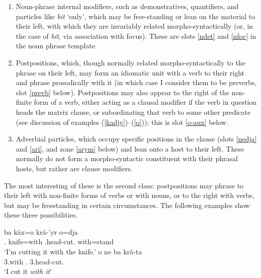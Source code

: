 \documentclass[output=paper]{langscibook}
\begin{document}
\begin{enumerate}
  \item Noun-phrase internal modifiers, such as demonstratives, quantifiers, and particles like {\em bit} ‘only’, which may be free-standing or lean on the material to their left, with which they are invariably related morpho-syntactically (or, in the case of {\em bit}, via association with focus). These are slots \ref{ndet} and \ref{nfoc} in the noun phrase template.
  \item\label{postpo} Postpositions, which, though normally related morpho-syntactically to the phrase on their left, may form an idiomatic unit with a verb to their right and phrase prosodically with it (in which case I consider them to be preverbs, slot \ref{prevb} below). Postpositions may also appear to the right of the non-finite form of a verb, either acting as a clausal modifier if the verb in question heads the matrix clause, or subordinating that verb to some other predicate (see discussion of examples (\ref{kadjy})--(\ref{o})); this is slot \ref{o-aux} below.
  \item Adverbial particles, which occupy specific positions in the clause (slots \ref{nedja} and \ref{ari}, and zone \ref{arym} below) and lean onto a host to their left. These normally do not form a morpho-syntactic constituent with their phrasal hosts, but rather are clause modifiers.
\end{enumerate}


The most interesting of these is the second class: postpositions may phrase to their left with non-finite forms of verbs or with nouns, or to the right with verbs, but may be freestanding in certain circumstances. The following examples show these three possibilities.


\ea
    \ea\label{krayrodja}\gll ba kàx=o krã-'yr o=dja\\
        \First.\Nom{} knife=with \Third.head-cut.\Nfin{} with=stand\\
      \glt `I'm cutting it with the knife.'
    \ex\gll o ne ba krã-ta\\
        3.with \Nfut{} \First.\Nom{} 3.head-cut.\Fin{}\\
      \glt `I cut it {\em with it}'
    \z
\z
\end{document}
